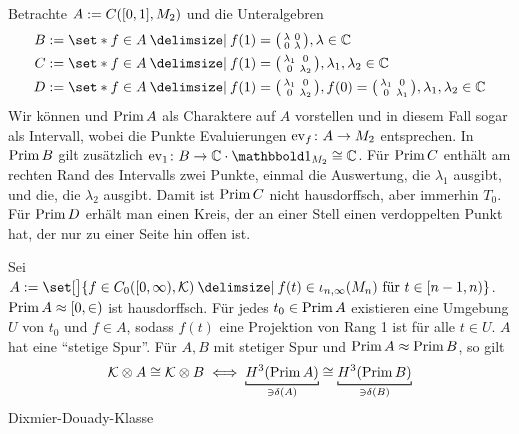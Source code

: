\begin{beispiel}
	Betrachte $A := C\enbrace*{[0,1],M_2}$ und die Unteralgebren 
	\begin{align}
		B &:= \set*{f \in A \given f(1) = \begin{psmallmatrix} \lambda & 0\\ 0 & \lambda \end{psmallmatrix}, \lambda \in \mathbb{C}}\\
		C &:= \set*{f \in A \given f(1) = \begin{psmallmatrix} \lambda_1 & 0\\ 0 & \lambda_2 \end{psmallmatrix}, \lambda_1, \lambda_2 \in \mathbb{C}} \\
		D &:= \set*{f \in A \given f(1)= \begin{psmallmatrix} \lambda_1 & 0\\ 0 & \lambda_2 \end{psmallmatrix}, f(0)= \begin{psmallmatrix} \lambda_1 & 0\\ 0 & \lambda_1 \end{psmallmatrix}, \lambda_1, \lambda_2 \in \mathbb{C}}
	\end{align}
	Wir können und $\operatorname{Prim} A$ als Charaktere auf $A$ vorstellen und in diesem Fall sogar als Intervall, wobei die Punkte Evaluierungen $\operatorname{ev}_f \colon A \to M_2$ entsprechen.
	In $\operatorname{Prim} B$ gilt zusätzlich $\ev_1 \colon B \to \mathbb{C} \cdot \ind_{M_2} \cong \mathbb{C}$.
	Für $\operatorname{Prim} C$ enthält am rechten Rand des Intervalls zwei Punkte, einmal die Auswertung, die $\lambda_1$ ausgibt, und die, die $\lambda_2$ ausgibt.
	Damit ist $\operatorname{Prim} C$ nicht hausdorffsch, aber immerhin $T_0$.
	Für $\operatorname{Prim} D$ erhält man einen Kreis, der an einer Stell einen verdoppelten Punkt hat, der nur zu einer Seite hin offen ist.
\end{beispiel}

\begin{beispiel}
	Sei $A := \set[\big]{f \in C_0\enbrace*{[0,\infty),\mathcal{K}} \given f(t) \in \iota_{n,\infty}(M_n) \text{ für }t \in [n-1,n)}$.
	$\operatorname{Prim} A \approx [0,\in )$ ist hausdorffsch.
	Für jedes $t_0 \in \operatorname{Prim} A$ existieren eine Umgebung $U$ von $t_0$ und $f \in A$, sodass $f(t)$ eine Projektion von Rang 1 ist für alle $t \in U$.
	$A$ hat eine \enquote{stetige Spur}.
	Für $A,B$ mit stetiger Spur und $\operatorname{Prim} A \approx \operatorname{Prim} B$, so gilt 
	\[
		\mathcal{K} \otimes A \cong \mathcal{K} \otimes B \iff \Underbracket{H^3(\Prim A)}{\ni \delta(A)}\cong \Underbracket{H^3(\Prim B)}{\ni\delta(B)} 
	\]
	Dixmier-Douady-Klasse
\end{beispiel}

